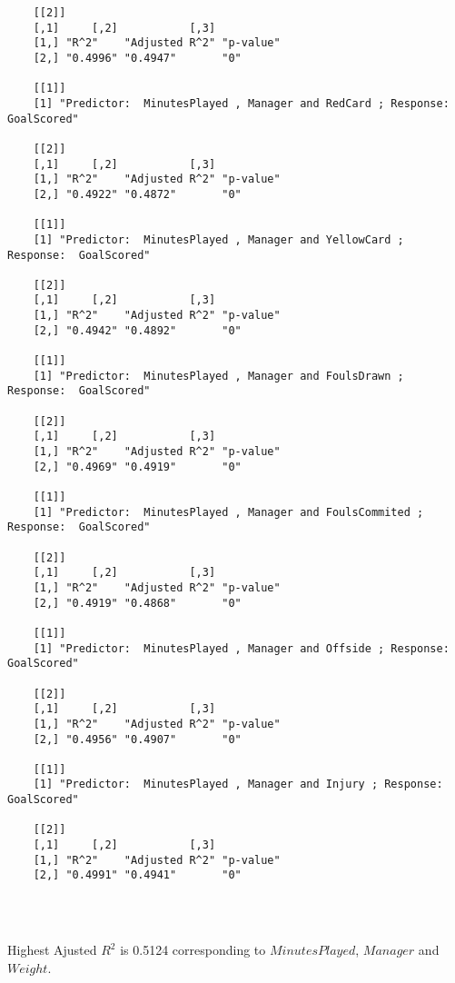 \documentclass[12pt]{article}
\begin{document}
\begin{verbatim}
	[[2]]
	[,1]     [,2]           [,3]     
	[1,] "R^2"    "Adjusted R^2" "p-value"
	[2,] "0.4996" "0.4947"       "0"      
	
	[[1]]
	[1] "Predictor:  MinutesPlayed , Manager and RedCard ; Response:  GoalScored"
	
	[[2]]
	[,1]     [,2]           [,3]     
	[1,] "R^2"    "Adjusted R^2" "p-value"
	[2,] "0.4922" "0.4872"       "0"      
	
	[[1]]
	[1] "Predictor:  MinutesPlayed , Manager and YellowCard ; Response:  GoalScored"
	
	[[2]]
	[,1]     [,2]           [,3]     
	[1,] "R^2"    "Adjusted R^2" "p-value"
	[2,] "0.4942" "0.4892"       "0"      
	
	[[1]]
	[1] "Predictor:  MinutesPlayed , Manager and FoulsDrawn ; Response:  GoalScored"
	
	[[2]]
	[,1]     [,2]           [,3]     
	[1,] "R^2"    "Adjusted R^2" "p-value"
	[2,] "0.4969" "0.4919"       "0"      
	
	[[1]]
	[1] "Predictor:  MinutesPlayed , Manager and FoulsCommited ; Response:  GoalScored"
	
	[[2]]
	[,1]     [,2]           [,3]     
	[1,] "R^2"    "Adjusted R^2" "p-value"
	[2,] "0.4919" "0.4868"       "0"      
	
	[[1]]
	[1] "Predictor:  MinutesPlayed , Manager and Offside ; Response:  GoalScored"
	
	[[2]]
	[,1]     [,2]           [,3]     
	[1,] "R^2"    "Adjusted R^2" "p-value"
	[2,] "0.4956" "0.4907"       "0"      
	
	[[1]]
	[1] "Predictor:  MinutesPlayed , Manager and Injury ; Response:  GoalScored"
	
	[[2]]
	[,1]     [,2]           [,3]     
	[1,] "R^2"    "Adjusted R^2" "p-value"
	[2,] "0.4991" "0.4941"       "0"      
	
		
		
	\end{verbatim}
	
	Highest Ajusted $ R^2 $ is 0.5124 corresponding to $ MinutesPlayed $, $ Manager $ and $ Weight $.
\end{document}
